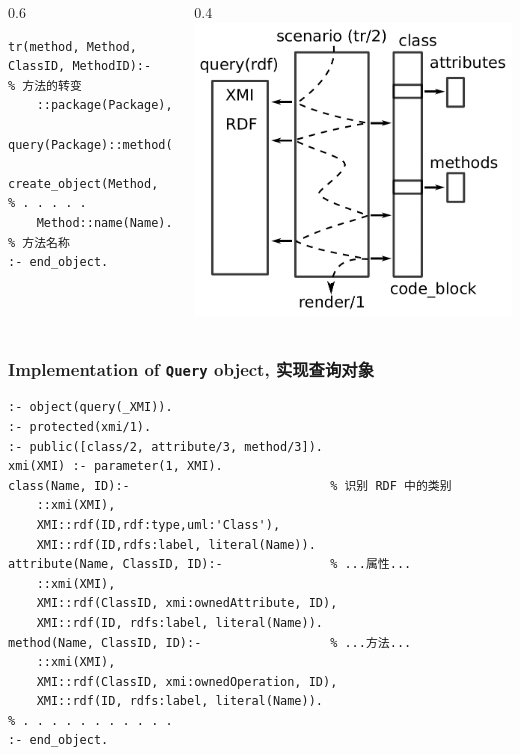 \documentclass[10pt]{beamer}
\begin{document}
\begin{frame}[fragile]
\begin{columns}
\begin{column}{0.6\textwidth}
\begin{verbatim}
tr(method, Method, ClassID, MethodID):-              % 方法的转变
    ::package(Package),
    query(Package)::method(Name,ClassID,MethodID),
    create_object(Method,     % . . . . .
    Method::name(Name).                              % 方法名称
:- end_object.
\end{verbatim}
    \end{column}
    \begin{column}{0.4\linewidth}
      \includegraphics[width=1\linewidth]{scenario.pdf}
    \end{column}
  \end{columns}
\end{frame}

\begin{frame}[fragile]
  \frametitle{Implementation of \texttt{Query} object, 实现查询对象}
\begin{verbatim}
:- object(query(_XMI)).
:- protected(xmi/1).
:- public([class/2, attribute/3, method/3]).
xmi(XMI) :- parameter(1, XMI).
class(Name, ID):-                            % 识别 RDF 中的类别
    ::xmi(XMI),
    XMI::rdf(ID,rdf:type,uml:'Class'),
    XMI::rdf(ID,rdfs:label, literal(Name)).
attribute(Name, ClassID, ID):-               % ...属性...
    ::xmi(XMI),
    XMI::rdf(ClassID, xmi:ownedAttribute, ID),
    XMI::rdf(ID, rdfs:label, literal(Name)).
method(Name, ClassID, ID):-                  % ...方法...
    ::xmi(XMI),
    XMI::rdf(ClassID, xmi:ownedOperation, ID),
    XMI::rdf(ID, rdfs:label, literal(Name)).
% . . . . . . . . . . .
:- end_object.
\end{verbatim}
\end{frame}
\end{document}
